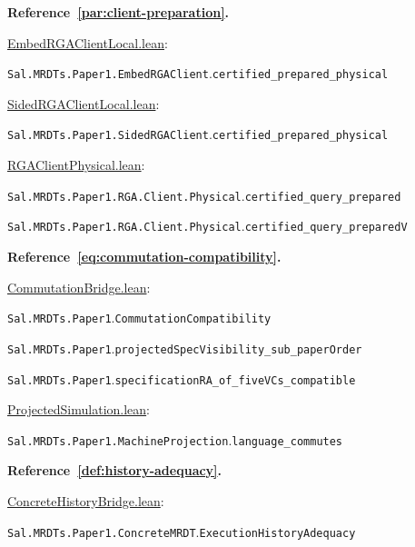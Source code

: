 \medskip\noindent\textbf{Reference~\ref{par:client-preparation}.}\par\nobreak
\noindent\href{https://github.com/fplaunchpad/sal/blob/paper1/Sal/MRDTs/Paper1/EmbedRGAClientLocal.lean}{EmbedRGAClientLocal.lean}:\par
{\small\nolinkurl{Sal.MRDTs.Paper1.EmbedRGAClient}.\allowbreak\nolinkurl{certified_prepared_physical}}\par
\noindent\href{https://github.com/fplaunchpad/sal/blob/paper1/Sal/MRDTs/Paper1/SidedRGAClientLocal.lean}{SidedRGAClientLocal.lean}:\par
{\small\nolinkurl{Sal.MRDTs.Paper1.SidedRGAClient}.\allowbreak\nolinkurl{certified_prepared_physical}}\par
\noindent\href{https://github.com/fplaunchpad/sal/blob/paper1/Sal/MRDTs/Paper1/RGAClientPhysical.lean}{RGAClientPhysical.lean}:\par
{\small\nolinkurl{Sal.MRDTs.Paper1.RGA.Client.Physical}.\allowbreak\nolinkurl{certified_query_prepared}}\par
{\small\nolinkurl{Sal.MRDTs.Paper1.RGA.Client.Physical}.\allowbreak\nolinkurl{certified_query_preparedV}}\par

\medskip\noindent\textbf{Reference~\ref{eq:commutation-compatibility}.}\par\nobreak
\noindent\href{https://github.com/fplaunchpad/sal/blob/paper1/Sal/MRDTs/Paper1/CommutationBridge.lean}{CommutationBridge.lean}:\par
{\small\nolinkurl{Sal.MRDTs.Paper1}.\allowbreak\nolinkurl{CommutationCompatibility}}\par
{\small\nolinkurl{Sal.MRDTs.Paper1}.\allowbreak\nolinkurl{projectedSpecVisibility_sub_paperOrder}}\par
{\small\nolinkurl{Sal.MRDTs.Paper1}.\allowbreak\nolinkurl{specificationRA_of_fiveVCs_compatible}}\par
\noindent\href{https://github.com/fplaunchpad/sal/blob/paper1/Sal/MRDTs/Paper1/ProjectedSimulation.lean}{ProjectedSimulation.lean}:\par
{\small\nolinkurl{Sal.MRDTs.Paper1.MachineProjection}.\allowbreak\nolinkurl{language_commutes}}\par

\medskip\noindent\textbf{Reference~\ref{def:history-adequacy}.}\par\nobreak
\noindent\href{https://github.com/fplaunchpad/sal/blob/paper1/Sal/MRDTs/Paper1/ConcreteHistoryBridge.lean}{ConcreteHistoryBridge.lean}:\par
{\small\nolinkurl{Sal.MRDTs.Paper1.ConcreteMRDT}.\allowbreak\nolinkurl{ExecutionHistoryAdequacy}}\par

